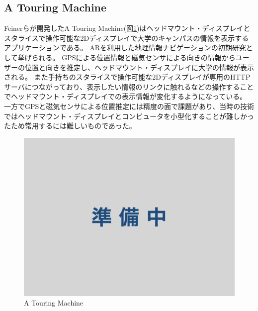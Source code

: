 \subsection{A Touring Machine}
Feinerらが開発したA Touring Machine\cite{629922}(図\ref{fig:a_touring_machine})はヘッドマウント・ディスプレイとスタライスで操作可能な2Dディスプレイで大学のキャンパスの情報を表示するアプリケーションである。
ARを利用した地理情報ナビゲーションの初期研究として挙げられる。
GPSによる位置情報と磁気センサによる向きの情報からユーザーの位置と向きを推定し、ヘッドマウント・ディスプレイに大学の情報が表示される。
また手持ちのスタライスで操作可能な2Dディスプレイが専用のHTTPサーバにつながっており、表示したい情報のリンクに触れるなどの操作することでヘッドマウント・ディスプレイでの表示情報が変化するようになっている。
一方でGPSと磁気センサによる位置推定には精度の面で課題があり、当時の技術ではヘッドマウント・ディスプレイとコンピュータを小型化することが難しかったため常用するには難しいものであった。

\begin{figure}[htbp]
  \centering 
  \includegraphics[width=150mm]{images/wip.jpg}
  \caption{A Touring Machine} \label{fig:a_touring_machine}
\end{figure}


